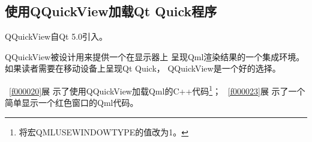 \FloatBarrier
\subsection{
使用QQuickView加载Qt Quick程序
}\label{ss001010}


QQuickView自Qt 5.0引入。

QQuickView被设计用来提供一个在显示器上
呈现Qml渲染结果的一个集成环境。
如果读者需要在移动设备上呈现Qt Quick，
QQuickView是一个好的选择。

\filesourcenumbernameone\ \ref{f000020}展
示了使用QQuickView加载Qml的C{\sourcefonttwo{}+}{\sourcefonttwo{}+}代码\footnote{
将宏QML\underline{\hspace{0.5em}}USE\underline{\hspace{0.5em}}WINDOW\underline{\hspace{0.5em}}TYPE的值改为1。
}；
\filesourcenumbernameone\ \ref{f000023}展
示了一个简单显示一个红色窗口的Qml代码。

